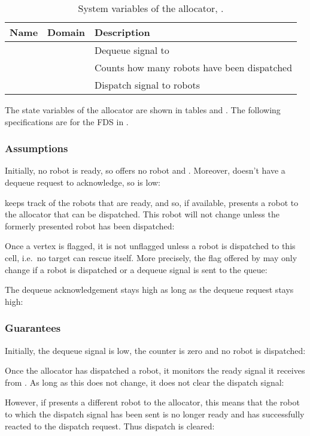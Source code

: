 \begin{table}
\centering
\begin{tabular}{c|c|l}
\hline
Name & Domain & Description \\
\hline
 &  & Dequeue signal to  \\
 &  & Counts how many robots have been dispatched \\
 &  & Dispatch signal to robots \\
\hline
\end{tabular}
\caption{System variables of the allocator, .}
\label{tab:sys:alloc}
\end{table}

The state variables of the allocator are shown in tables  and . The following specifications are for the FDS  in .\\ 


\subsubsection{Assumptions}

Initially, no robot is ready, so  offers no robot and . Moreover,  doesn't have a dequeue request to acknowledge, so  is low:


 keeps track of the robots that are ready, and so, if available, presents a robot to the allocator that can be dispatched. This robot will not change unless the formerly presented robot has been dispatched:


Once a vertex is flagged, it is not unflagged unless a robot is dispatched to this cell, i.e.\ no target can rescue itself. More precisely, the flag offered by  may only change if a robot is dispatched or a dequeue signal is sent to the queue:


The dequeue acknowledgement stays high as long as the dequeue request stays high:



\subsubsection{Guarantees}

Initially, the dequeue signal is low, the counter is zero and no robot is dispatched:


Once the allocator has dispatched a robot, it monitors the ready signal it receives from . As long as this does not change, it does not clear the dispatch signal:

However, if  presents a different robot to the allocator, this means that the robot to which the dispatch signal has been sent is no longer ready and has successfully reacted to the dispatch request. Thus dispatch is cleared:


